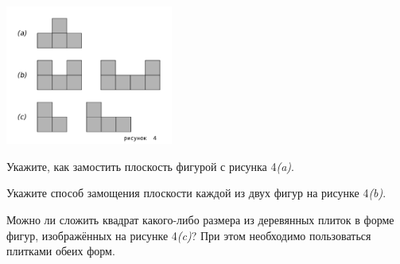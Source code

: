 ﻿
\vspace{-0.7cm}
\centerline{\includegraphics[width=5.5cm]{stats/2018/images/plane-park}}

\begin{enumerate}
\itA Укажите, как замостить плоскость фигурой с рисунка 4{\it (a)}.

\itB Укажите способ замощения плоскости каждой из двух фигур на рисунке 4{\it (b)}.

\itC Можно ли сложить квадрат какого-либо размера из деревянных плиток в форме фигур, изображённых на рисунке 4{\it (c)}? При этом необходимо пользоваться плитками обеих форм.
\end{enumerate}